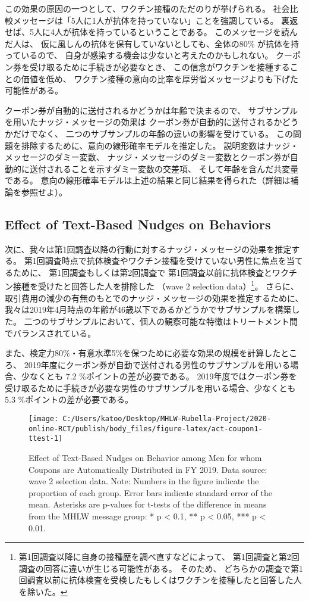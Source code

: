 \documentclass[
  11pt,
  a4paper,
]{article}
\begin{document}
この効果の原因の一つとして、ワクチン接種のただのりが挙げられる。
社会比較メッセージは「5人に1人が抗体を持っていない」ことを強調している。
裏返せば、5人に4人が抗体を持っているということである。
このメッセージを読んだ人は、
仮に風しんの抗体を保有していないとしても、全体の80\% が抗体を持っているので、
自身が感染する機会は少ないと考えたのかもしれない。
クーポン券を受け取るために手続きが必要なとき、
この信念がワクチンを接種することの価値を低め、
ワクチン接種の意向の比率を厚労省メッセージよりも下げた可能性がある。

クーポン券が自動的に送付されるかどうかは年齢で決まるので、
サブサンプルを用いたナッジ・メッセージの効果は
クーポン券が自動的に送付されるかどうかだけでなく、
二つのサブサンプルの年齢の違いの影響を受けている。
この問題を排除するために、意向の線形確率モデルを推定した。
説明変数はナッジ・メッセージのダミー変数、
ナッジ・メッセージのダミー変数とクーポン券が自動的に送付されることを示すダミー変数の交差項、
そして年齢を含んだ共変量である。
意向の線形確率モデルは上述の結果と同じ結果を得られた（詳細は補論を参照せよ）。

\hypertarget{behavior}{%
\subsection{Effect of Text-Based Nudges on Behaviors}\label{behavior}}

次に、我々は第1回調査以降の行動に対するナッジ・メッセージの効果を推定する。
第1回調査時点で抗体検査やワクチン接種を受けていない男性に焦点を当てるために、
第1回調査もしくは第2回調査で
第1回調査以前に抗体検査とワクチン接種を受けたと回答した人を排除した
（wave 2 selection data）\footnote{第1回調査以降に自身の接種歴を調べ直すなどによって、
  第1回調査と第2回調査の回答に違いが生じる可能性がある。
  そのため、
  どちらかの調査で第1回調査以前に抗体検査を受検したもしくはワクチンを接種したと回答した人を除いた。}。
さらに、
取引費用の減少の有無のもとでのナッジ・メッセージの効果を推定するために、
我々は2019年4月時点の年齢が46歳以下であるかどうかでサブサンプルを構築した。
二つのサブサンプルにおいて、個人の観察可能な特徴はトリートメント間でバランスされている。

また、検定力80\%・有意水準5\%を保つために必要な効果の規模を計算したところ、
2019年度にクーポン券が自動で送付される男性のサブサンプルを用いる場合、少なくとも
7.2
\%ポイントの差が必要である。
2019年度ではクーポン券を受け取るために手続きが必要な男性のサブサンプルを用いる場合、少なくとも
5.3
\%ポイントの差が必要である。

\begin{figure}[t]
\texttt{[image: C:/Users/katoo/Desktop/MHLW-Rubella-Project/2020-online-RCT/publish/body\_files/figure-latex/act-coupon1-ttest-1]} \caption{Effect of Text-Based Nudges on Behavior among Men for whom Coupons are Automatically Distributed in FY 2019. Data source: wave 2 selection data. Note: Numbers in the figure indicate the proportion of each group. Error bars indicate standard error of the mean. Asterisks are p-values for t-tests of the difference in means from the MHLW message group: * p < 0.1, ** p < 0.05, *** p < 0.01.}\label{fig:act-coupon1-ttest}
\end{figure}
\end{document}
